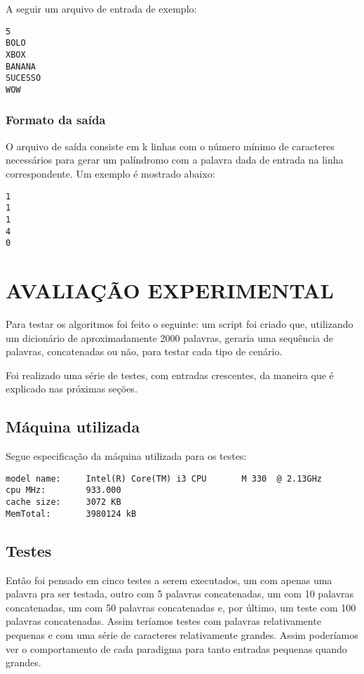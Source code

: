 \documentclass[12pt]{article}
\begin{document}
A seguir um arquivo de entrada de exemplo:

\begin{verbatim}
5
BOLO
XBOX
BANANA
SUCESSO
WOW
\end{verbatim}

\subsubsection{Formato da saída}

O arquivo de saída consiste em k linhas com o número mínimo de caracteres necessários para gerar um palíndromo com a palavra dada de entrada na linha correspondente. Um exemplo é mostrado abaixo:

\begin{verbatim}
1
1
1
4
0
\end{verbatim}


\section{AVALIAÇÃO EXPERIMENTAL}
\label{avaliacao_experimental}

Para testar os algoritmos foi feito o seguinte: um script foi criado que, utilizando um dicionário de aproximadamente 2000 palavras, geraria uma sequência de palavras, concatenadas ou não, para testar cada tipo de cenário.

Foi realizado uma série de testes, com entradas crescentes, da maneira que é explicado nas próximas seções.

\subsection{Máquina utilizada}
\label{maquina}

Segue especificação da máquina utilizada para os testes:
\begin{verbatim}
model name:     Intel(R) Core(TM) i3 CPU       M 330  @ 2.13GHz
cpu MHz:        933.000
cache size:     3072 KB
MemTotal:       3980124 kB
\end{verbatim}


\subsection{Testes}
\label{testes}

Então foi pensado em cinco testes a serem executados, um com apenas uma palavra pra ser testada, outro com 5 palavras concatenadas, um com 10 palavras concatenadas, um com 50 palavras concatenadas e, por último, um teste com 100 palavras concatenadas. Assim teríamos testes com palavras relativamente pequenas e com uma série de caracteres relativamente grandes. Assim poderíamos ver o comportamento de cada paradigma para tanto entradas pequenas quando grandes.
\end{document}
